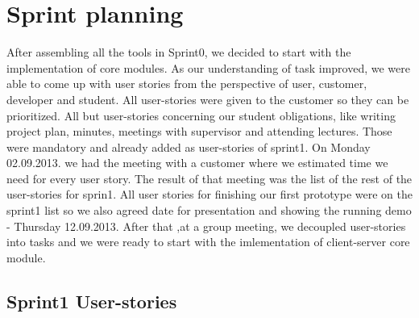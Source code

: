 \section{Sprint planning}
After assembling all the tools in Sprint0, we decided to start with the implementation of core modules.
As our understanding of task improved, we were able to come up with user stories from the perspective of user, customer, developer and student.
All user-stories were given to the customer so they can be prioritized. 
All but user-stories concerning our student obligations, like writing project plan, minutes, meetings with supervisor and attending lectures.
Those were mandatory and already added as user-stories of sprint1.
On Monday 02.09.2013. we had the meeting with a customer where we estimated time we need for every user story.
The result of that meeting was the list of the rest of the user-stories for sprin1.
All user stories for finishing our first prototype were on the sprint1 list so we also agreed date for presentation and showing the running demo - Thursday 12.09.2013. 
After that ,at a group meeting, we decoupled user-stories into tasks and we were ready to start with the imlementation of client-server core module.


\subsection{Sprint1 User-stories}

